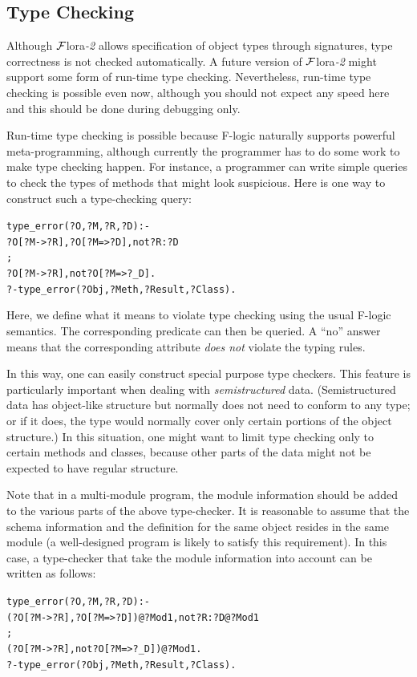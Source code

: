 \documentclass[11pt]{article}
\newcommand{\FLORA}{{\mbox{\sc ${\cal F}${lora}\rm\emph{-2}}}\xspace}
\newcommand{\fl}{\mbox{F-logic}\xspace}
\newcommand{\TNOT}{{{\tt not}}\xspace}
\begin{document}
\subsection{Type Checking}\label{sec-typechecking}

Although \FLORA allows specification of object types through signatures,
type correctness is not checked automatically.
A future version of \FLORA might support some form of run-time type
checking. Nevertheless, run-time type checking is possible even now,
although you should not expect any speed here and this should be done
during debugging only.

Run-time type checking is possible because \fl naturally supports powerful
meta-programming, although currently the programmer has to do some work to
make type checking happen.  For instance, a programmer can write simple
queries to check the types of methods that might look suspicious.  Here is
one way to construct such a type-checking query:
\begin{alltt}
type_error(?O,?M,?R,?D) :-
       ?O[?M->?R], ?O[?M=>?D], \TNOT ?R:?D
       ;
       ?O[?M->?R], \TNOT ?O[?M=>?_D].
?- type_error(?Obj,?Meth,?Result,?Class).
\end{alltt}
Here, we define what it means to violate type checking using the usual
\fl semantics. The corresponding predicate can then be queried. A
``no'' answer means that the corresponding attribute \emph{does not}
violate the typing rules.

In this way, one can easily construct special purpose type checkers.  This
feature is particularly important when dealing with \emph{semistructured}
data. (Semistructured data has object-like structure but normally does not
need to conform to any type; or if it does, the type would normally cover
only certain portions of the object structure.) In this situation, one
might want to limit type checking only to certain methods and classes,
because other parts of the data might not be expected to have regular
structure.

Note that in a multi-module program, the module information should be added
to the various parts of the above type-checker. It is reasonable to assume
that the schema information and the definition for the same object
resides in the same module (a well-designed program is likely to satisfy
this requirement). In this case, a type-checker that take the module
information into account can be written as follows:
\begin{alltt}
type_error(?O,?M,?R,?D) :-
       (?O[?M->?R], ?O[?M=>?D])@?Mod1, \TNOT ?R:?D@?Mod1
       ;
       (?O[?M->?R], \TNOT ?O[?M=>?_D])@?Mod1.
?- type_error(?Obj,?Meth,?Result,?Class).
\end{alltt}
\end{document}
